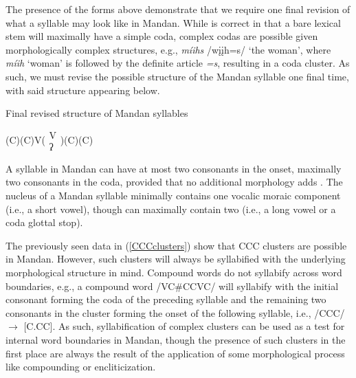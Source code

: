 The presence of the forms above demonstrate that we require one final revision of what a syllable may look like in Mandan. While \citeauthor{hollow1970} is correct in that a bare lexical stem will maximally have a simple coda, complex codas are possible given morphologically complex structures, e.g., \textit{míihs} /wįįh=s/ `the woman', where \textit{míih} `woman' is followed by the definite article \textit{=s}, resulting in a coda cluster. As such, we must revise the possible structure of the Mandan syllable one final time, with said structure appearing below.

\begin{exe}
\item\label{mandansyllablefinal} Final revised structure of Mandan syllables

(C)(C)V($\substack{\text{V}\\\text{ʔ}}$)(C)(C)

\end{exe}

A syllable in Mandan can have at most two consonants in the onset, maximally two consonants in the coda, provided that no additional morphology adds . The nucleus of a Mandan syllable minimally contains one vocalic moraic component (i.e., a short vowel), though can maximally contain two (i.e., a long vowel or a coda glottal stop).

The previously seen data in (\ref{CCCclusters}) show that CCC clusters are possible in Mandan. However, such clusters will always be syllabified with the underlying morphological structure in mind. Compound words do not syllabify across word boundaries, e.g., a compound word /VC\#CCVC/ will syllabify with the initial consonant forming the coda of the preceding syllable and the remaining two consonants in the cluster forming the onset of the following syllable, i.e., /CCC/ $\to$ [C.CC]. As such, syllabification of complex clusters can be used as a test for internal word boundaries in Mandan, though the presence of such clusters in the first place are always the result of the application of some morphological process like compounding or encliticization. %

